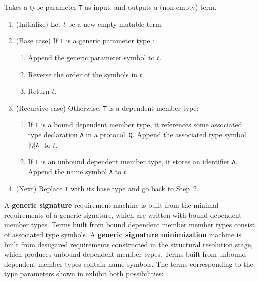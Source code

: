 \documentclass[../generics]{subfiles}
\begin{document}
\begin{algorithm}\label{build term generic}
Takes a type parameter \texttt{T} as input, and outputs a (non-empty) term.
\begin{enumerate}
\item (Initialize) Let $t$ be a new empty mutable term.
\item (Base case) If \texttt{T} is a generic parameter type :
\begin{enumerate}
\item Append the generic parameter symbol  to $t$.
\item Reverse the order of the symbols in $t$.
\item Return $t$.
\end{enumerate}
\item (Recursive case) Otherwise, \texttt{T} is a dependent member type:
\begin{enumerate}
\item If \texttt{T} is a bound dependent member type, it references some associated type declaration \texttt{A} in a protocol~\texttt{Q}. Append the associated type symbol $[\texttt{Q}|\texttt{A}]$ to $t$.
\item If \texttt{T} is an unbound dependent member type, it stores an identifier \texttt{A}. Append the name symbol \texttt{A} to $t$.
\end{enumerate}
\item (Next) Replace \texttt{T} with its base type and go back to Step~2.
\end{enumerate}
\end{algorithm}
%
A \textbf{generic signature} requirement machine is built from the minimal requirements of a generic signature, which are written with bound dependent member types. Terms built from bound dependent member member types consist of associated type symbols. A \textbf{generic signature minimization} machine is built from desugared requirements constructed in the structural resolution stage, which produces unbound dependent member types. Terms built from unbound dependent member types contain name symbols. The terms corresponding to the type parameters shown in  exhibit both possibilities:
\end{document}
